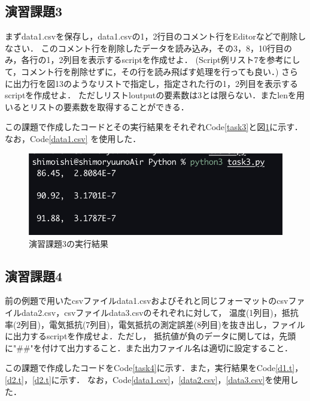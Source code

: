 \documentclass[a4paper,11pt]{jsarticle}
\begin{document}
\subsection{演習課題3}
  \begin{screen}
    まずdata1.csvを保存し，data1.csvの1，2行目のコメント行をEditorなどで削除しなさい．
    このコメント行を削除したデータを読み込み，その3，8，10行目のみ，各行の1，2列目を表示するscriptを作成せよ．
    (Script例リスト7を参考にして，コメント行を削除せずに，その行を読み飛ばす処理を行っても良い．)
    さらに出力行を図13のようなリストで指定し，指定された行の1，2列目を表示するscriptを作成せよ．
    ただしリストloutputの要素数は3とは限らない．またlenを用いるとリストの要素数を取得することができる．
  \end{screen}
  この課題で作成したコードとその実行結果をそれぞれCode\ref{task3}と図\ref{task3ans}に示す．なお，Code\ref{data1.csv}
  を使用した．
  
  \begin{figure}[H]
    \centering
    \includegraphics[width=0.8\linewidth]{Experiment_photo/task3.png}
    \caption{演習課題3の実行結果}
    \label{task3ans}
  \end{figure}

\subsection{演習課題4}
  \begin{screen}
    前の例題で用いたcsvファイルdata1.csvおよびそれと同じフォーマットのcsvファイルdata2.csv，csvファイルdata3.csvのそれぞれに対して，
    温度(1列目)，抵抗率(2列目)，電気抵抗(7列目)，電気抵抗の測定誤差(8列目)を抜き出し，ファイルに出力するscriptを作成せよ．ただし，
    抵抗値が負のデータに関しては，先頭に"\#\#"を付けて出力すること．また出力ファイル名は適切に設定すること．
  \end{screen}
  この課題で作成したコードをCode\ref{task4}に示す．また，実行結果をCode\ref{d1.t}，\ref{d2.t}，\ref{d2.t}に示す．
  なお，Code\ref{data1.csv}，\ref{data2.csv}，\ref{data3.csv}を使用した．
  
  
  
  
\end{document}
